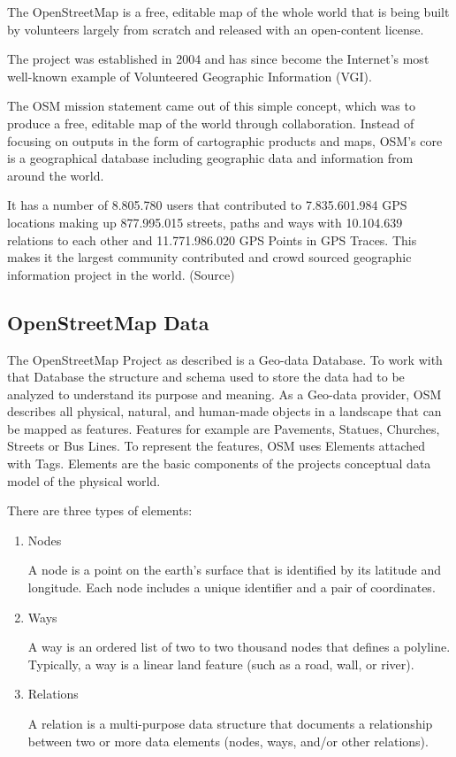 The OpenStreetMap is a free, editable map of the whole world that is being built by volunteers largely from scratch and released with an open-content license. 
\autocite[]{wiki:about}

The project was established in 2004 and has since become the Internet's most well-known example of Volunteered Geographic Information (VGI). \autocite[]{JokarArsanjani2015} 

The OSM mission statement came out of this simple concept, which was to produce a free, editable map of the world through collaboration. Instead of focusing on outputs in the form of cartographic products and maps, OSM's core is a geographical database including geographic data and information from around the world. \autocite[]{Antoniou2017}

It has a number of 8.805.780 users that contributed to 7.835.601.984 GPS locations making up 877.995.015 streets, paths and ways with 10.104.639 relations to each other and 11.771.986.020 GPS Points in GPS Traces. This makes it the largest community contributed and crowd sourced geographic information project in the world. (Source)


\subsection{OpenStreetMap Data}

The OpenStreetMap Project as described is a Geo-data Database. To work with that Database the structure and schema used to store the data had to be analyzed to understand its purpose and meaning. As a Geo-data provider, OSM describes all physical, natural, and human-made objects in a landscape that can be mapped as features. Features for example are Pavements, Statues, Churches, Streets or Bus Lines. To represent the features, OSM uses Elements attached with Tags. Elements are the basic components of the projects conceptual data model of the physical world.

There are three types of elements:

\begin{enumerate}
    \item Nodes
    
    A node is a point on the earth's surface that is identified by its latitude and longitude. Each node includes a unique identifier and a pair of coordinates. 
    
    \item Ways
    
    A way is an ordered list of two to two thousand nodes that defines a polyline. Typically, a way is a linear land feature (such as a road, wall, or river).
    
    \item Relations
    
    A relation is a multi-purpose data structure that documents a relationship between two or more data elements (nodes, ways, and/or other relations).
    
\end{enumerate}

